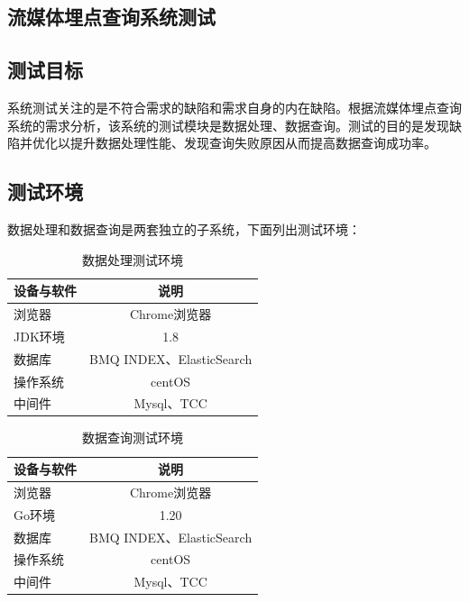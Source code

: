 \begin{longtable}[htbp]
\chapter{流媒体埋点查询系统测试}
\section{测试目标}

系统测试关注的是不符合需求的缺陷和需求自身的内在缺陷。根据流媒体埋点查询系统的需求分析，该系统的测试模块是数据处理、数据查询。测试的目的是发现缺陷并优化以提升数据处理性能、发现查询失败原因从而提高数据查询成功率。

\section{测试环境}

数据处理和数据查询是两套独立的子系统，下面列出测试环境：

\begin{table}[h]  
\centering
\caption{数据处理测试环境}
\begin{tabular}{|l|c|}  
\hline  
\textbf{设备与软件} & \textbf{说明} \\ \hline  
浏览器 & Chrome浏览器 \\ \hline  
JDK环境 & 1.8 \\ \hline  
数据库 & BMQ INDEX、ElasticSearch \\ \hline  
操作系统 & centOS \\ \hline  
中间件 & Mysql、TCC \\ \hline  
\end{tabular} 
\label{table:dataChuliTestEnvironment}
\end{table}

\begin{table}[h]  
\centering
\caption{数据查询测试环境}
\begin{tabular}{|l|c|}  
\hline  
\textbf{设备与软件} & \textbf{说明} \\ \hline  
浏览器 & Chrome浏览器 \\ \hline  
Go环境 & 1.20 \\ \hline  
数据库 & BMQ INDEX、ElasticSearch \\ \hline  
操作系统 & centOS \\ \hline  
中间件 & Mysql、TCC \\ \hline  
\end{tabular}  
\label{table:dataSearchTestEnvironment}
\end{table}


\end{longtable}
